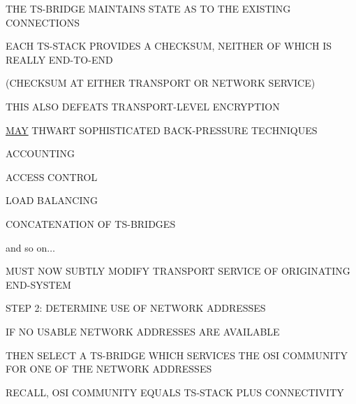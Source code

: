 

\begin{bwslide}

\begin{nrtc}
\item	THE TS-BRIDGE MAINTAINS STATE AS TO THE EXISTING CONNECTIONS

\item	EACH TS-STACK PROVIDES A CHECKSUM,
	NEITHER OF WHICH IS REALLY END-TO-END
    \begin{nrtc}
    \item	(CHECKSUM AT EITHER TRANSPORT OR NETWORK SERVICE)
    \end{nrtc}

\item	THIS ALSO DEFEATS TRANSPORT-LEVEL ENCRYPTION

\item	\underline{MAY} THWART SOPHISTICATED BACK-PRESSURE TECHNIQUES
\end{nrtc}
\end{bwslide}


\begin{bwslide}

\begin{nrtc}
\item	ACCOUNTING

\item	ACCESS CONTROL

\item	LOAD BALANCING

\item	CONCATENATION OF TS-BRIDGES

\item	and so on$\ldots$
\end{nrtc}
\end{bwslide}


\begin{bwslide}

\begin{nrtc}
\item	MUST NOW SUBTLY MODIFY TRANSPORT SERVICE OF ORIGINATING END-SYSTEM
    \begin{nrtc}
    \item	STEP 2: DETERMINE USE OF NETWORK ADDRESSES
    \end{nrtc}

\item	IF NO USABLE NETWORK ADDRESSES ARE AVAILABLE

\item	THEN SELECT A TS-BRIDGE WHICH SERVICES THE OSI COMMUNITY FOR ONE OF
	THE NETWORK ADDRESSES
    \begin{nrtc}
    \item	 RECALL, OSI COMMUNITY EQUALS TS-STACK PLUS CONNECTIVITY
    \end{nrtc}
\end{nrtc}
\end{bwslide}


